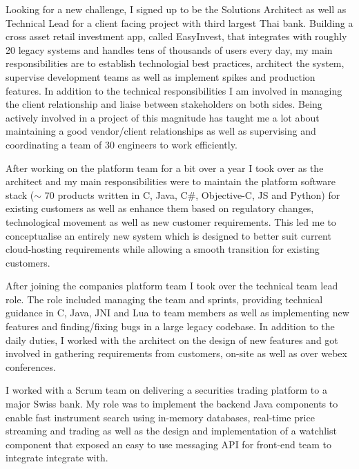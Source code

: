 \documentclass[11pt,a4paper]{my_cv}
\begin{document}
Looking for a new challenge, I signed up to be the Solutions Architect as well as Technical Lead for a client facing project with third largest Thai bank. Building a cross asset retail investment app, called EasyInvest, that integrates with roughly 20 legacy systems and handles tens of thousands of users every day, my main responsibilities are to establish technologial best practices, architect the system, supervise development teams as well as implement spikes and production features. In addition to the technical responsibilities I am involved in managing the client relationship and liaise between stakeholders on both sides. Being actively involved in a project of this magnitude has taught me a lot about maintaining a good vendor/client relationships as well as supervising and coordinating a team of 30 engineers to work efficiently.

After working on the platform team for a bit over a year I took over as the architect and my main responsibilities were to maintain the platform software stack ($\sim$ 70 products written in C, Java, C\#, Objective-C, JS and Python) for existing customers as well as enhance them based on regulatory changes, technological movement as well as new customer requirements. This led me to conceptualise an entirely new system which is designed to better suit current cloud-hosting requirements while allowing a smooth transition for existing customers.

After joining the companies platform team I took over the technical team lead role. The role included managing the team and sprints, providing technical guidance in C, Java, JNI and Lua to team members as well as implementing new features and finding/fixing bugs in a large legacy codebase. In addition to the daily duties, I worked with the architect on the design of new features and got involved in gathering requirements from customers, on-site as well as over webex conferences.

I worked with a Scrum team on delivering a securities trading platform to a major Swiss bank. My role was to implement the backend Java components to enable fast instrument search using in-memory databases, real-time price streaming and trading as well as the design and implementation of a watchlist component that exposed an easy to use messaging API for front-end team to integrate integrate with.
\end{document}

